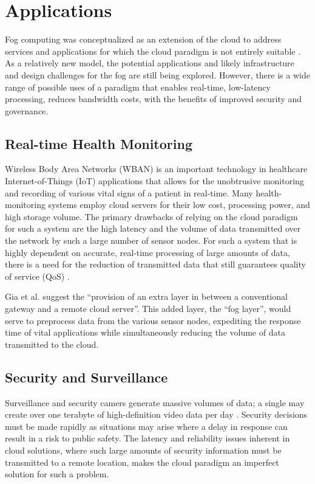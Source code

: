 \documentclass{article}
\begin{document}
\pagebreak

\section{Applications}

Fog computing was conceptualized as an extension of the cloud to address services and applications for which the cloud paradigm is not entirely suitable \cite{bessis2014big}. As a relatively new model, the potential applications and likely infrastructure and design challenges for the fog are still being explored. However, there is a wide range of possible uses of a paradigm that enables real-time, low-latency processing, reduces bandwidth costs, with the benefits of improved security and governance.

\subsection{Real-time Health Monitoring}
Wireless Body Area Networks (WBAN) is an important technology in healthcare Internet-of-Things (IoT) applications that allows for the unobtrusive monitoring and recording of various vital signs of a patient in real-time. Many health-monitoring systems employ cloud servers for their low cost, processing power, and high storage volume. The primary drawbacks of relying on the cloud paradigm for such a system are the high latency and the volume of data transmitted over the network by such a large number of sensor nodes. For such a system that is highly dependent on accurate, real-time processing of large amounts of data, there is a need for the reduction of transmitted data that still guarantees quality of service (QoS) \cite{gia2015fog}.

Gia et al. \cite{gia2015fog} suggest the ``provision of an extra layer in between a conventional gateway and a remote cloud server''. This added layer, the ``fog layer'', would serve to preprocess data from the various sensor nodes, expediting the response time of vital applications while simultaneously reducing the volume of data transmitted to the cloud.

\subsection{Security and Surveillance}
Surveillance and security camers generate massive volumes of data; a single may create over one terabyte of high-definition video data per day \cite{openfogconsortium2017visualsecurity}. Security decisions must be made rapidly as situations may arise where a delay in response can result in a risk to public safety. The latency and reliability issues inherent in cloud solutions, where such large amounts of security information must be transmitted to a remote location, makes the cloud paradigm an imperfect solution for such a problem.
\end{document}
